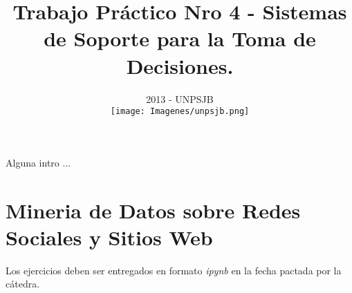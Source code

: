\documentclass{article}
\begin{document}
\begin{large}
\title{\bf {Trabajo Práctico Nro 4 - Sistemas de Soporte para la Toma de Decisiones.}}
\end{large}
\date{2013 - UNPSJB\\[1cm]\texttt{[image: Imagenes/unpsjb.png]}}

\maketitle
\newpage

Alguna intro ...

\section{Mineria de Datos sobre Redes Sociales y Sitios Web}
Los ejercicios deben ser entregados en formato \emph{ipynb} en la fecha pactada por la cátedra.

\end{document}
